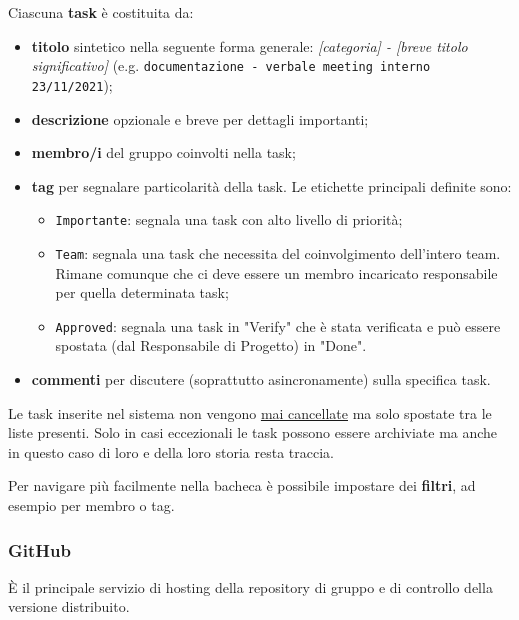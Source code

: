 Ciascuna \textbf{task} è costituita da:
\begin{itemize}
  \item \textbf{titolo} sintetico nella seguente forma generale: \textit{[categoria] - [breve titolo significativo]} (e.g. \texttt{documentazione - verbale meeting interno 23/11/2021});
  \item \textbf{descrizione} opzionale e breve per dettagli importanti;
  \item \textbf{membro/i} del gruppo coinvolti nella task;
  \item \textbf{tag} per segnalare particolarità della task. Le etichette principali definite sono:
  \begin{itemize}
    \item \texttt{Importante}: segnala una task con alto livello di priorità;
    \item \texttt{Team}: segnala una task che necessita del coinvolgimento dell'intero team. Rimane comunque che ci deve essere un membro incaricato responsabile per quella determinata task;
    \item \texttt{Approved}: segnala una task in "Verify" che è stata verificata e può essere spostata (dal Responsabile di Progetto) in "Done".
  \end{itemize}
  \item \textbf{commenti} per discutere (soprattutto asincronamente) sulla specifica task. 
\end{itemize}
Le task inserite nel sistema non vengono \underline{mai cancellate} ma solo spostate tra le liste presenti. Solo in casi eccezionali le task possono essere archiviate ma anche in questo caso di loro e della loro storia resta traccia.

Per navigare più facilmente nella bacheca è possibile impostare dei \textbf{filtri}, ad esempio per membro o tag.

\subsubsection{GitHub}
È il principale servizio di hosting della repository di gruppo e di controllo della versione distribuito. 

